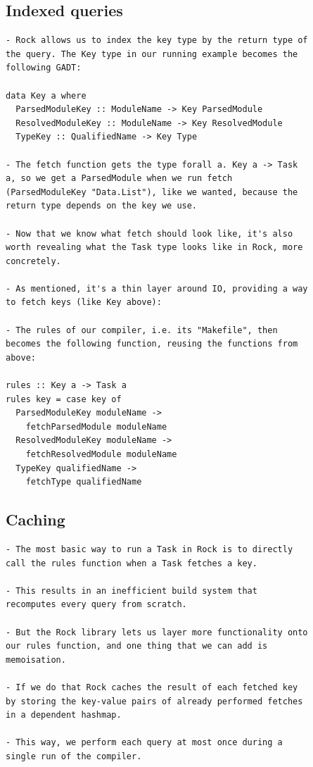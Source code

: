 \documentclass[12pt, a4paper]{report}
\begin{document}
\subsection*{Indexed queries \cite{olle_query_based}}

\begin{verbatim}
- Rock allows us to index the key type by the return type of
the query. The Key type in our running example becomes the
following GADT:

data Key a where
  ParsedModuleKey :: ModuleName -> Key ParsedModule
  ResolvedModuleKey :: ModuleName -> Key ResolvedModule
  TypeKey :: QualifiedName -> Key Type

- The fetch function gets the type forall a. Key a -> Task
a, so we get a ParsedModule when we run fetch
(ParsedModuleKey "Data.List"), like we wanted, because the
return type depends on the key we use.

- Now that we know what fetch should look like, it's also
worth revealing what the Task type looks like in Rock, more
concretely.

- As mentioned, it's a thin layer around IO, providing a way
to fetch keys (like Key above):

- The rules of our compiler, i.e. its "Makefile", then
becomes the following function, reusing the functions from
above:

rules :: Key a -> Task a
rules key = case key of
  ParsedModuleKey moduleName ->
    fetchParsedModule moduleName
  ResolvedModuleKey moduleName ->
    fetchResolvedModule moduleName
  TypeKey qualifiedName ->
    fetchType qualifiedName
\end{verbatim}
\cite{olle_query_based}

\subsection*{Caching \cite{olle_query_based}}

\begin{verbatim}
- The most basic way to run a Task in Rock is to directly
call the rules function when a Task fetches a key.

- This results in an inefficient build system that
recomputes every query from scratch.

- But the Rock library lets us layer more functionality onto
our rules function, and one thing that we can add is
memoisation.

- If we do that Rock caches the result of each fetched key
by storing the key-value pairs of already performed fetches
in a dependent hashmap.

- This way, we perform each query at most once during a
single run of the compiler.
\end{verbatim}
\cite{olle_query_based}
\end{document}
